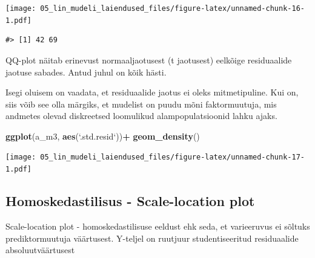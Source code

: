 \documentclass[]{book}
\newenvironment{Shaded}{\begin{snugshade}}{\end{snugshade}}
\newcommand{\KeywordTok}[1]{\textcolor[rgb]{0.13,0.29,0.53}{\textbf{#1}}}
\newcommand{\DataTypeTok}[1]{\textcolor[rgb]{0.13,0.29,0.53}{#1}}
\newcommand{\FloatTok}[1]{\textcolor[rgb]{0.00,0.00,0.81}{#1}}
\newcommand{\StringTok}[1]{\textcolor[rgb]{0.31,0.60,0.02}{#1}}
\newcommand{\OtherTok}[1]{\textcolor[rgb]{0.56,0.35,0.01}{#1}}
\newcommand{\OperatorTok}[1]{\textcolor[rgb]{0.81,0.36,0.00}{\textbf{#1}}}
\newcommand{\NormalTok}[1]{#1}
\begin{document}
\texttt{[image: 05\_lin\_mudeli\_laiendused\_files/figure-latex/unnamed-chunk-16-1.pdf]}

\begin{verbatim}
#> [1] 42 69
\end{verbatim}

QQ-plot näitab erinevust normaaljaotusest (t jaotusest) eelkõige
residuaalide jaotuse sabades. Antud juhul on kõik hästi.

Isegi oluisem on vaadata, et residuaalide jaotus ei oleks mitmetipuline.
Kui on, siis võib see olla märgiks, et mudelist on puudu mõni
faktormuutuja, mis andmetes olevad diskreetsed loomulikud
alampopulatsioonid lahku ajaks.

\begin{Shaded}
\begin{Highlighting}[]
\KeywordTok{ggplot}\NormalTok{(a_m3, }\KeywordTok{aes}\NormalTok{(}\StringTok{`}\DataTypeTok{.std.resid}\StringTok{`}\NormalTok{))}\OperatorTok{+}\StringTok{ }\KeywordTok{geom_density}\NormalTok{()}
\end{Highlighting}
\end{Shaded}

\texttt{[image: 05\_lin\_mudeli\_laiendused\_files/figure-latex/unnamed-chunk-17-1.pdf]}

\subsection*{Homoskedastilisus - Scale-location
plot}\label{homoskedastilisus---scale-location-plot}

Scale-location plot - homoskedastilisuse eeldust ehk seda, et
varieeruvus ei sõltuks prediktormuutuja väärtusest. Y-teljel on ruutjuur
studentiseeritud residuaalide absoluutväärtusest

\begin{Shaded}
\end{Shaded}
\end{document}
